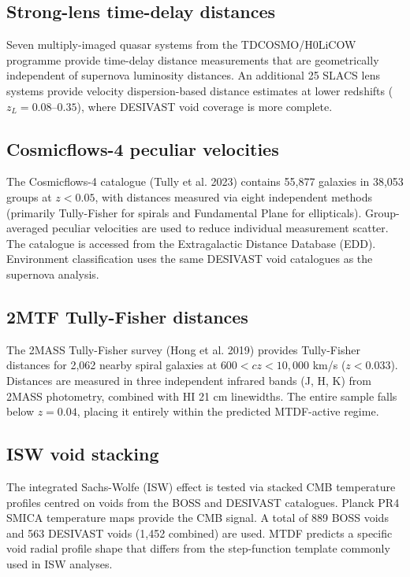 \documentclass[11pt,a4paper]{article}
\begin{document}
\subsection{Strong-lens time-delay distances}
Seven multiply-imaged quasar systems from the TDCOSMO/\allowbreak{}H0LiCOW programme provide time-delay distance measurements that are geometrically independent of supernova luminosity distances. An additional 25 SLACS lens systems provide velocity dispersion-based distance estimates at lower redshifts (\(z_L = 0.08\text{--}0.35\)), where DESIVAST void coverage is more complete.

\subsection{Cosmicflows-4 peculiar velocities}
The Cosmicflows-4 catalogue (Tully et al. 2023) contains 55,877 galaxies in 38,053 groups at \(z < 0.05\), with distances measured via eight independent methods (primarily Tully-Fisher for spirals and Fundamental Plane for ellipticals). Group-averaged peculiar velocities are used to reduce individual measurement scatter. The catalogue is accessed from the Extragalactic Distance Database (EDD). Environment classification uses the same DESIVAST void catalogues as the supernova analysis.

\subsection{2MTF Tully-Fisher distances}
The 2MASS Tully-Fisher survey (Hong et al. 2019) provides Tully-Fisher distances for 2,062 nearby spiral galaxies at \(600 < cz < 10{,}000\) km/\allowbreak{}s (\(z < 0.033\)). Distances are measured in three independent infrared bands (J, H, K) from 2MASS photometry, combined with HI 21 cm linewidths. The entire sample falls below \(z = 0.04\), placing it entirely within the predicted MTDF-active regime.

\subsection{ISW void stacking}
The integrated Sachs-Wolfe (ISW) effect is tested via stacked CMB temperature profiles centred on voids from the BOSS and DESIVAST catalogues. Planck PR4 SMICA temperature maps provide the CMB signal. A total of 889 BOSS voids and 563 DESIVAST voids (1,452 combined) are used. MTDF predicts a specific void radial profile shape that differs from the step-function template commonly used in ISW analyses.
\end{document}
